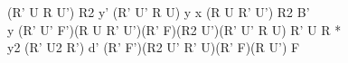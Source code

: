 (R' U R U') R2 y' (R' U' R U) y x (R U R' U') R2 B'\\
y (R' U' F')(R U R' U')(R' F)(R2 U')(R' U' R U) R' U R *\\
y2 (R' U2 R') d' (R' F')(R2 U' R' U)(R' F)(R U') F\\
